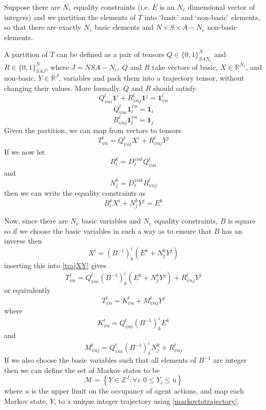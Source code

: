\documentclass{article}
\begin{document}
Suppose there are $N_e$ equality constraints (i.e. $E$ is an $N_e$ dimensional vector of integers) and we partition the elements of $T$ into `basic' and `non-basic' elements, so that there are exactly $N_e$ basic elements and $N\times S \times A - N_e$ non-basic elements.

A partition of $T$ can be defined as a pair of tensors $Q\in\{0,1\}_{SAN_e}^{N}$ and $R\in\{0,1\}_{SAJ}^{N}$, where $J=NSA - N_e$. $Q$ and $R$ take vectors of basic, $X\in\mathbb{R}^{N_e}$, and non-basic, $Y\in\mathbb{R}^J$, variables and pack them into a trajectory tensor, without changing their values. More formally, $Q$ and $R$ should satisfy
 \[
Q_{\psi ai}^{t} \mathbf{1}^i + R_{ \psi  aj}^{t} \mathbf{1}^j =  \mathbf{1}^t_{\psi a}
 \]
 \[
Q_{\psi ai}^{t} \mathbf{1}_t^{\psi a} = \mathbf{1}_i
 \]
 \[
R_{\psi aj}^{t} \mathbf{1}_t^{\psi a} = \mathbf{1}_j
\]
Given the partition, we can map from vectors to tensors
\begin{equation}
T^{t}_{\psi a} =  Q_{\psi ai}^{t} X^i + R_{ \psi  aj}^{t} Y^j
\label{trajXY}
\end{equation}
If we now let
\begin{equation}
B_i^k = D^{\psi ak}_{t}Q_{\psi a i}^{t}
\label{Bmatrix}
\end{equation}
and
\[
N_j^k = D^{\psi ak}_{t}R_{\psi aj}^{t}
\]
then we can write the equality constraints as
\begin{equation}
B_i^kX^i + N_j^kY^j = E^k
\label{eqconstraints}
\end{equation}

Now, since there are $N_e$ basic variables and $N_e$ equality constraints, $B$ is square so if we choose the basic variables in such a way as to ensure that $B$ has an inverse then
\begin{equation}
X^i = (B^{-1})^i_k(E^k + N_j^kY^j)
\label{basicvars}
\end{equation}
inserting this into \eqref{trajXY} gives
\begin{equation}
T^t_{\psi a} =  Q_{\psi ai}^{t}(B^{-1})^i_k(E^k + N_j^kY^j) + R_{\psi aj}^{t } Y^j
\label{markovtotrajectorytensor}
\end{equation}
or equivalently
\begin{equation}
T^t_{\psi a} =  K^t_{\psi a} + M^{t}_{\psi aj} Y^j
\label{markovtotrajectory}
\end{equation}
where
\[
K^t_{\psi a} = Q_{\psi ai}^{t} (B^{-1})^i_kE^k
\]
and
\[
M^{t}_{\psi aj} = Q_{\psi ai}^{t} (B^{-1})^i_kN_j^k + R_{\psi aj}^{t}
\]
If we also choose the basic variables such that all elements of $B^{-1}$ are integer then we can define the set of Markov states to be
\[
\mathcal{M} = \left\{ Y \in \mathbb{Z}^J: \forall i:0 \le Y_i \le u \right\}
\]
where $u$ is the upper limit on the occupancy of agent actions, and map each Markov state, $Y$, to a unique integer trajectory using \eqref{markovtotrajectory}.
\end{document}
